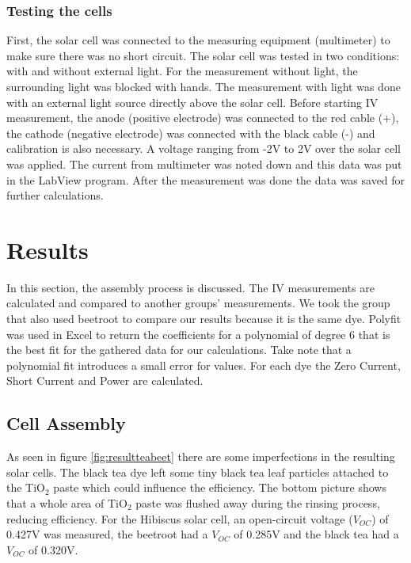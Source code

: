 \documentclass[conference]{IEEEtran}
\begin{document}
\subsubsection{Testing the cells}
First, the solar cell was connected to the measuring equipment (multimeter) to make sure there was no short circuit. The solar cell was tested in two conditions: with and without external light. For the measurement without light, the surrounding light was blocked with hands. The measurement with light was done with an external light source directly above the solar cell. Before starting IV measurement, the anode (positive electrode) was connected to the red cable (+), the cathode (negative electrode) was connected with the black cable (-) and calibration is also necessary. A voltage ranging from -2V to 2V over the solar cell was applied. The current from multimeter was noted down and this data was put in the LabView program. After the measurement was done the data was saved for further calculations.

\section{Results}
In this section, the assembly process is discussed. The IV measurements are calculated and compared to another groups' measurements. We took the group that also used beetroot to compare our results because it is the same dye. Polyfit was used in Excel to return the coefficients for a polynomial of degree 6 that is the best fit for the gathered data for our calculations. Take note that a polynomial fit introduces a small error for values. For each dye the Zero Current, Short Current and Power are calculated.\\

\subsection{Cell Assembly}
As seen in figure \ref{fig:resultteabeet} there are some imperfections in the resulting solar cells. The black tea dye left some tiny black tea leaf particles attached to the TiO$_2$ paste which could influence the efficiency. The bottom picture shows that a whole area of TiO$_2$ paste was flushed away during the rinsing process, reducing efficiency.
For the Hibiscus solar cell, an open-circuit voltage ($V_{OC}$) of 0.427V was measured, the beetroot had a $V_{OC}$ of 0.285V and the black tea had a $V_{OC}$ of 0.320V.\\
\end{document}
